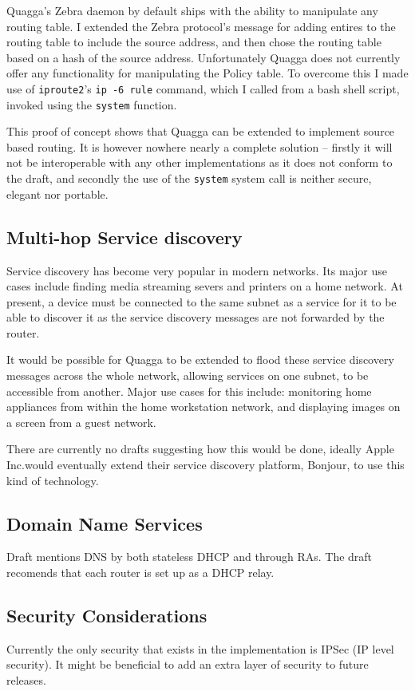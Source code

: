 \documentclass[12pt]{report}
\begin{document}
Quagga's Zebra daemon by default ships with the ability to manipulate any
routing table. I extended the Zebra protocol's message for adding entires to
the routing table to include the source address, and then chose the routing
table based on a hash of the source address.  Unfortunately Quagga does not
currently offer any functionality for manipulating the Policy table. To
overcome this I made use of \texttt{iproute2}'s \texttt{ip -6 rule} command,
which I called from a bash shell script, invoked using the \texttt{system}
function. 

This proof of concept shows that Quagga can be extended to implement source
based routing. It is however nowhere nearly a complete solution -- firstly it
will not be interoperable with any other implementations as it does not conform
to the draft, and secondly the use of the \texttt{system} system call is
neither secure, elegant nor portable. 

\subsection{Multi-hop Service discovery}
Service discovery has become very popular in modern networks. Its major use
cases include finding media streaming severs and printers on a home network. At
present, a device must be connected to the same subnet as a service for it to
be able to discover it as the service discovery messages are not forwarded by
the router. 

It would be possible for Quagga to be extended to flood these service discovery
messages across the whole network, allowing services on one subnet, to be
accessible from another. Major use cases for this include: monitoring home
appliances from within the home workstation network, and displaying images on a
screen from a guest network.

There are currently no drafts suggesting how this would be done, ideally Apple
Inc.\@ would eventually extend their service discovery platform, Bonjour, to
use this kind of technology.

\subsection{Domain Name Services}
Draft mentions DNS by both stateless DHCP and through RAs. The draft recomends
that each router is set up as a DHCP relay.

\subsection{Security Considerations}
Currently the only security that exists in the implementation is IPSec (IP
level security). It might be beneficial to add an extra layer of security to future 
releases.
\end{document}
